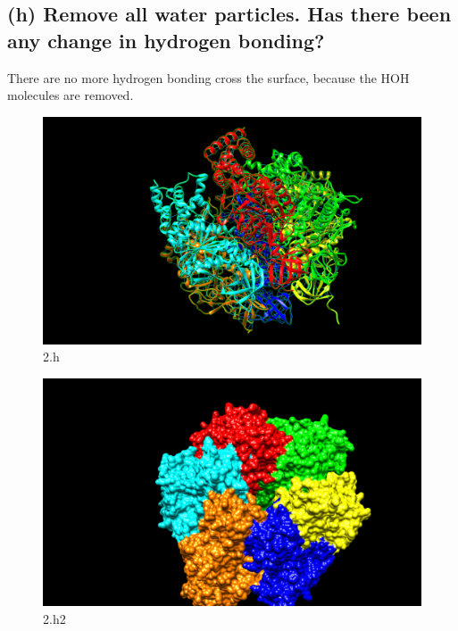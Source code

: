 \documentclass[a4paper, 12pt, one column]{article}
\begin{document}
\subsection*{(h) Remove all water particles. Has there been any change in hydrogen bonding?}
There are no more hydrogen bonding cross the surface, because the HOH molecules are removed.
\begin{figure}[H]
    \centering
    \includegraphics[width=.8\linewidth]{2_h.png}
    \caption{2.h}
    \label{fig:2_h.png}
\end{figure}
\begin{figure}[H]
    \centering
    \includegraphics[width=.8\linewidth]{2_h2.png}
    \caption{2.h2}
    \label{fig:2_h2.png}
\end{figure}
\end{document}
